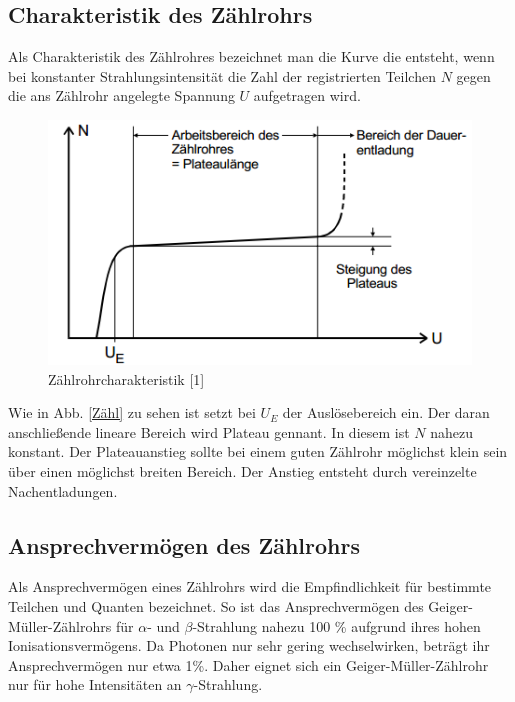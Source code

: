 \subsection{Charakteristik des Zählrohrs}
Als Charakteristik des Zählrohres bezeichnet man die Kurve die entsteht, wenn bei konstanter Strahlungsintensität die Zahl der registrierten Teilchen $N$ gegen die ans Zählrohr angelegte Spannung $U$ aufgetragen wird. 
	\begin{figure}[h]
		\begin{center}
		\includegraphics[scale=0.8]{Zahlrohrcharakteristik.png}
		\caption{Zählrohrcharakteristik [1]}
		\label{Zähl}
		\end{center}	
	\end{figure}
Wie in Abb. \eqref{Zähl} zu sehen ist setzt bei $U_{E}$ der Auslösebereich ein. Der daran anschließende lineare Bereich wird Plateau gennant. In diesem ist  $N$ nahezu konstant. Der Plateauanstieg sollte bei einem guten Zählrohr möglichst klein sein über einen möglichst breiten Bereich. Der Anstieg entsteht durch vereinzelte Nachentladungen. 
\subsection{Ansprechvermögen des Zählrohrs}
Als Ansprechvermögen eines Zählrohrs wird die Empfindlichkeit für bestimmte Teilchen und Quanten bezeichnet. So  ist das Ansprechvermögen des Geiger-Müller-Zählrohrs für $\alpha$- und $\beta$-Strahlung nahezu 100 \% aufgrund ihres hohen Ionisationsvermögens. Da Photonen nur sehr gering wechselwirken, beträgt ihr Ansprechvermögen nur etwa 1\%. Daher eignet sich ein Geiger-Müller-Zählrohr nur für hohe Intensitäten an $\gamma$-Strahlung.
